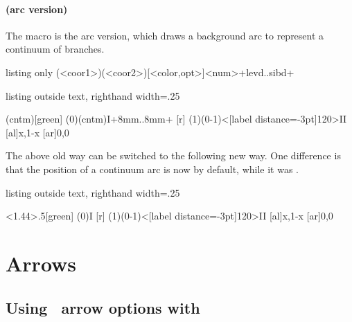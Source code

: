 \paragraph{\protect\cmd{\istcntmarc} (arc version)}

The macro \cmd{\istcntmarc} is the arc version, which draws a background arc to represent a continuum of branches.

\begin{tcblisting}{listing only}
  (<coor1>)(<coor2>)[<color,opt>]{<num>}+levd..sibd+
\end{tcblisting}


\begin{tcblisting}{listing outside text, righthand width=.25\linewidth}
\begin{istgame}[scale=1.2]
\istcntmarc(cntm)[green]
\istroot(0)(cntm){I}+8mm..8mm+
  [r]  \istbm  \endist
\xtdistance{10mm}{18mm}
\istroot(1)(0-1)<[label distance=-3pt]120>{II}
  [al]{x,1-x}  [ar]{0,0}  \endist
\end{istgame}
\end{tcblisting}

The above old way can be switched to the following new way.
One difference is that the position of a continuum arc is now  by default, while it was .

\begin{tcblisting}{listing outside text, righthand width=.25\linewidth}
\begin{istgame}[scale=1.2]
\cntmApreset<1.44>{.5}[green]
\istrootcntmA(0){I}
  [r]  \istbm  \endist
\xtdistance{10mm}{18mm}
\istroot(1)(0-1)<[label distance=-3pt]120>{II}
  [al]{x,1-x}  [ar]{0,0}  \endist
\end{istgame}
\end{tcblisting}


\section{Arrows}
\label{sec:arrows}

\subsection{Using \TikZ\ arrow options with }


